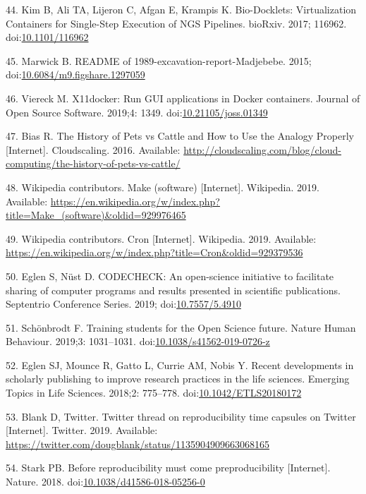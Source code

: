\documentclass[10pt,letterpaper]{article}
\begin{document}
\leavevmode\hypertarget{ref-kim_bio-docklets_2017}{}%
44. Kim B, Ali TA, Lijeron C, Afgan E, Krampis K. Bio-Docklets:
Virtualization Containers for Single-Step Execution of NGS Pipelines.
bioRxiv. 2017; 116962.
doi:\href{https://doi.org/10.1101/116962}{10.1101/116962}

\leavevmode\hypertarget{ref-marwick_readme_2015}{}%
45. Marwick B. README of 1989-excavation-report-Madjebebe. 2015;
doi:\href{https://doi.org/10.6084/m9.figshare.1297059}{10.6084/m9.figshare.1297059}

\leavevmode\hypertarget{ref-viereck_x11docker_2019}{}%
46. Viereck M. X11docker: Run GUI applications in Docker containers.
Journal of Open Source Software. 2019;4: 1349.
doi:\href{https://doi.org/10.21105/joss.01349}{10.21105/joss.01349}

\leavevmode\hypertarget{ref-bias_history_2016}{}%
47. Bias R. The History of Pets vs Cattle and How to Use the Analogy
Properly {[}Internet{]}. Cloudscaling. 2016. Available:
\url{http://cloudscaling.com/blog/cloud-computing/the-history-of-pets-vs-cattle/}

\leavevmode\hypertarget{ref-wikipedia_contributors_make_2019}{}%
48. Wikipedia contributors. Make (software) {[}Internet{]}. Wikipedia.
2019. Available:
\url{https://en.wikipedia.org/w/index.php?title=Make_(software)\&oldid=929976465}

\leavevmode\hypertarget{ref-wikipedia_contributors_cron_2019}{}%
49. Wikipedia contributors. Cron {[}Internet{]}. Wikipedia. 2019.
Available:
\url{https://en.wikipedia.org/w/index.php?title=Cron\&oldid=929379536}

\leavevmode\hypertarget{ref-eglen_codecheck_2019}{}%
50. Eglen S, Nüst D. CODECHECK: An open-science initiative to facilitate
sharing of computer programs and results presented in scientific
publications. Septentrio Conference Series. 2019;
doi:\href{https://doi.org/10.7557/5.4910}{10.7557/5.4910}

\leavevmode\hypertarget{ref-schonbrodt_training_2019}{}%
51. Schönbrodt F. Training students for the Open Science future. Nature
Human Behaviour. 2019;3: 1031--1031.
doi:\href{https://doi.org/10.1038/s41562-019-0726-z}{10.1038/s41562-019-0726-z}

\leavevmode\hypertarget{ref-eglen_recent_2018}{}%
52. Eglen SJ, Mounce R, Gatto L, Currie AM, Nobis Y. Recent developments
in scholarly publishing to improve research practices in the life
sciences. Emerging Topics in Life Sciences. 2018;2: 775--778.
doi:\href{https://doi.org/10.1042/ETLS20180172}{10.1042/ETLS20180172}

\leavevmode\hypertarget{ref-blank_twitter_2019}{}%
53. Blank D, Twitter. Twitter thread on reproducibility time capsules on
Twitter {[}Internet{]}. Twitter. 2019. Available:
\url{https://twitter.com/dougblank/status/1135904909663068165}

\leavevmode\hypertarget{ref-stark_before_2018}{}%
54. Stark PB. Before reproducibility must come preproducibility
{[}Internet{]}. Nature. 2018.
doi:\href{https://doi.org/10.1038/d41586-018-05256-0}{10.1038/d41586-018-05256-0}

\nolinenumbers
\end{document}
